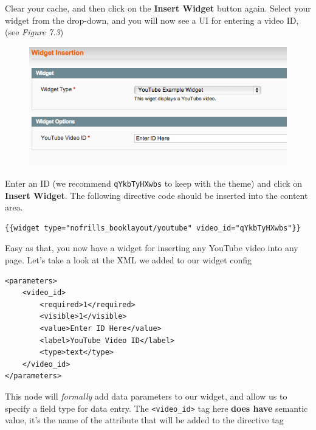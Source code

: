 \documentclass[oneside]{book}
\begin{document}
Clear your cache, and then click on the \textbf{Insert Widget} button again.  Select your widget from the drop-down, and you will now see a UI for entering a video ID, (see \emph{Figure 7.3})

\begin{figure}[htb]
\begin{center}
\leavevmode
\includegraphics[width=1\textwidth]{images/chapter7/widget-window-with-data.png}
\end{center}
\caption{}
\end{figure}


Enter an ID (we recommend \footnotesize\texttt{qYkbTyHXwbs} \normalsize  to keep with the theme) and click on \textbf{Insert Widget}.  The following directive code should be inserted into the content area.

\begin{lstlisting}
{{widget type="nofrills_booklayout/youtube" video_id="qYkbTyHXwbs"}}

\end{lstlisting}


Easy as that, you now have a widget for inserting any YouTube video into any page.  Let's take a look at the XML we added to our widget config

\begin{lstlisting}
<parameters>
    <video_id>
        <required>1</required>
        <visible>1</visible>
        <value>Enter ID Here</value>
        <label>YouTube Video ID</label>
        <type>text</type>
    </video_id>
</parameters>

\end{lstlisting}


This node will \emph{formally} add data parameters to our widget, and allow us to specify a field type for data entry.  The \footnotesize\texttt{\textless video\_id\textgreater } \normalsize  tag here \textbf{does have} semantic value, it's the name of the attribute that will be added to the directive tag
\end{document}
